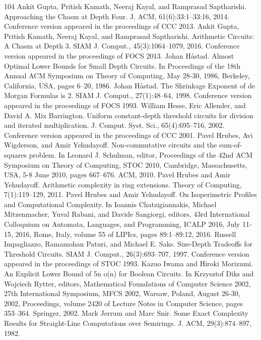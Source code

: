 \documentclass[10pt,a4paper]{article}
\begin{document}
\begin{thebibliography}{104}
 Ankit Gupta, Pritish Kamath, Neeraj Kayal, and Ramprasad Saptharishi. Approaching the Chasm at Depth Four. J. ACM, 61(6):33:1–33:16, 2014. Conference version appeared in the proceedings of CCC 2013.
 Ankit Gupta, Pritish Kamath, Neeraj Kayal, and Ramprasad Saptharishi. Arithmetic Circuits: A Chasm at Depth 3. SIAM J. Comput., 45(3):1064–1079, 2016. Conference version appeared in the proceedings of FOCS 2013.
 Johan Håstad. Almost Optimal Lower Bounds for Small Depth Circuits. In Proceedings of the 18th Annual ACM Symposium on Theory of Computing, May 28-30, 1986, Berkeley, California, USA, pages 6–20, 1986.
 Johan Håstad. The Shrinkage Exponent of de Morgan Formulas is 2. SIAM J. Comput., 27(1):48–64, 1998. Conference version appeared in the proceedings of FOCS 1993.
 William Hesse, Eric Allender, and David A. Mix Barrington. Uniform constant-depth threshold circuits for division and iterated multiplication. J. Comput. Syst. Sci., 65(4):695–716, 2002. Conference version appeared in the proceedings of CCC 2001.
 Pavel Hrubes, Avi Wigderson, and Amir Yehudayoff. Non-commutative circuits and the sum-of-squares problem. In Leonard J. Schulman, editor, Proceedings of the 42nd ACM Symposium on Theory of Computing, STOC 2010, Cambridge, Massachusetts, USA, 5-8 June 2010, pages 667–676. ACM, 2010.
 Pavel Hrubes and Amir Yehudayoff. Arithmetic complexity in ring extensions. Theory of Computing, 7(1):119–129, 2011.
 Pavel Hrubes and Amir Yehudayoff. On Isoperimetric Profiles and Computational Complexity. In Ioannis Chatzigiannakis, Michael Mitzenmacher, Yuval Rabani, and Davide Sangiorgi, editors, 43rd International Colloquium on Automata, Languages, and Programming, ICALP 2016, July 11-15, 2016, Rome, Italy, volume 55 of LIPIcs, pages 89:1–89:12, 2016.
 Russell Impagliazzo, Ramamohan Paturi, and Michael E. Saks. Size-Depth Tradeoffs for Threshold Circuits. SIAM J. Comput., 26(3):693–707, 1997. Conference version appeared in the proceedings of STOC 1993.
 Kazuo Iwama and Hiroki Morizumi. An Explicit Lower Bound of 5n o(n) for Boolean Circuits. In Krzysztof Diks and Wojciech Rytter, editors, Mathematical Foundations of Computer Science 2002, 27th International Symposium, MFCS 2002, Warsaw, Poland, August 26-30, 2002, Proceedings, volume 2420 of Lecture Notes in Computer Science, pages 353–364. Springer, 2002.
 Mark Jerrum and Marc Snir. Some Exact Complexity Results for Straight-Line Computations over Semirings. J. ACM, 29(3):874–897, 1982.

\end{thebibliography}
\end{document}

